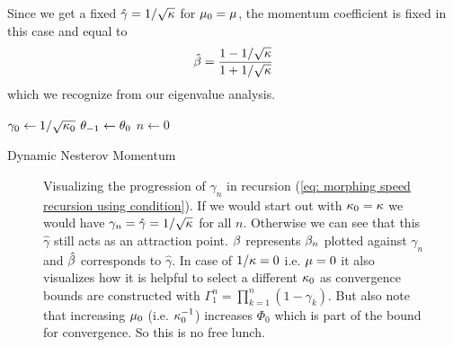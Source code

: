 Since we get a fixed \(\hat{\gamma}=1/\sqrt{\kappa}\) for
\(\mu_0=\mu\), the momentum coefficient is fixed in this case and equal to 
\begin{align*}
	\hat{\beta} = \frac{1-1/\sqrt{\kappa}}{1+1/\sqrt{\kappa}}
\end{align*}
which we recognize from our eigenvalue analysis.

\begin{algorithm}
	\(\gamma_0 \leftarrow 1/\sqrt{\kappa_0}\)
	\(\theta_{-1} \leftarrow \theta_0\)\;
	\(n\leftarrow 0\)\;
	\caption{Dynamic Nesterov Momentum\label{algo: dynamic nesterov momentum}}
\end{algorithm}

\begin{figure}[h]
	\centering
	\def\svgwidth{1\textwidth}
	
	\caption{
		Visualizing the progression of \(\gamma_n\) in recursion (\ref{eq:
		morphing speed recursion using condition}). If we would start out with
		\(\kappa_0=\kappa\) we would have \(\gamma_n=\hat{\gamma}=1/\sqrt{\kappa}\)
		for all \(n\). Otherwise we can see that this \(\hat{\gamma}\) still
		acts as an attraction point. \(\beta\) represents \(\beta_n\)
		plotted against \(\gamma_n\) and \(\hat{\beta}\) corresponds
		to \(\hat{\gamma}\).
		In case of \(1/\kappa=0\) i.e. \(\mu=0\)
		it also visualizes how it is helpful to select a different \(\kappa_0\)
		as convergence bounds are constructed with
		\(\Gamma_1^n=\prod_{k=1}^n(1-\gamma_k)\).
		But also note that increasing \(\mu_0\) (i.e. \(\kappa_0^{-1}\))
		increases \(\Phi_0\) which is part of the bound for convergence. So
		this is no free lunch.
	}
	\label{fig: gamma path}
\end{figure}

